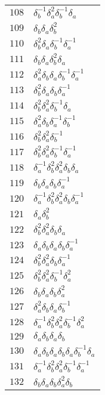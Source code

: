 \documentclass{article}
\begin{document}
\begin{center}
\begin{tabular}{ll}
$108$ & $\delta_b^{-1}\delta_a^{2}\delta_b^{-1}\delta_a^{}$ \\
$109$ & $\delta_b^{}\delta_a^{}\delta_b^{2}$ \\
$110$ & $\delta_b^{2}\delta_a^{}\delta_b^{-1}\delta_a^{-1}$ \\
$111$ & $\delta_b^{}\delta_a^{}\delta_b^{2}\delta_a^{}$ \\
$112$ & $\delta_a^{2}\delta_b^{}\delta_a^{}\delta_b^{-1}\delta_a^{-1}$ \\
$113$ & $\delta_b^{2}\delta_a^{}\delta_b^{}\delta_a^{-1}$ \\
$114$ & $\delta_b^{2}\delta_a^{2}\delta_b^{-1}\delta_a^{}$ \\
$115$ & $\delta_a^{2}\delta_b^{}\delta_a^{-1}\delta_b^{-1}$ \\
$116$ & $\delta_b^{2}\delta_a^{2}\delta_b^{-1}$ \\
$117$ & $\delta_b^{2}\delta_a^{2}\delta_b^{-1}\delta_a^{-1}$ \\
$118$ & $\delta_a^{-1}\delta_b^{2}\delta_a^{2}\delta_b^{}\delta_a^{}$ \\
$119$ & $\delta_b^{}\delta_a^{}\delta_b^{}\delta_a^{-1}$ \\
$120$ & $\delta_a^{-1}\delta_b^{2}\delta_a^{2}\delta_b^{}\delta_a^{-1}$ \\
$121$ & $\delta_a^{}\delta_b^{2}$ \\
$122$ & $\delta_b^{2}\delta_a^{2}\delta_b^{}\delta_a^{}$ \\
$123$ & $\delta_a^{}\delta_b^{}\delta_a^{}\delta_b^{}\delta_a^{-1}$ \\
$124$ & $\delta_b^{2}\delta_a^{2}\delta_b^{}\delta_a^{-1}$ \\
$125$ & $\delta_b^{2}\delta_a^{2}\delta_b^{-1}\delta_a^{2}$ \\
$126$ & $\delta_b^{}\delta_a^{}\delta_b^{}\delta_a^{2}$ \\
$127$ & $\delta_a^{2}\delta_b^{}\delta_a^{}\delta_b^{-1}$ \\
$128$ & $\delta_a^{-1}\delta_b^{2}\delta_a^{2}\delta_b^{-1}\delta_a^{2}$ \\
$129$ & $\delta_a^{}\delta_b^{}\delta_a^{}\delta_b^{}$ \\
$130$ & $\delta_a^{}\delta_b^{}\delta_a^{}\delta_b^{}\delta_a^{}\delta_b^{-1}\delta_a^{}$ \\
$131$ & $\delta_a^{-1}\delta_b^{2}\delta_a^{2}\delta_b^{-1}\delta_a^{-1}$ \\
$132$ & $\delta_b^{}\delta_a^{}\delta_b^{}\delta_a^{2}\delta_b^{}$ \\

\end{tabular}
\end{center}
\end{document}

